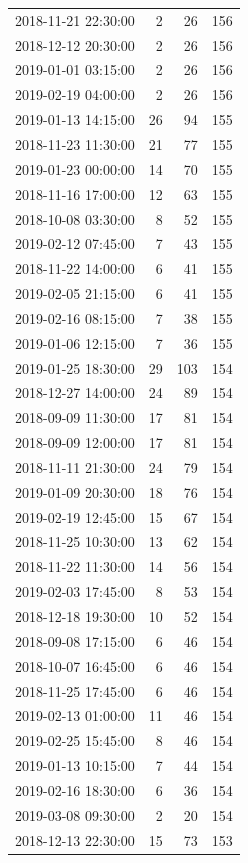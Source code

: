 \begin{tabular}{lrrr}
2018-11-21 22:30:00 & 2 & 26 & 156 \\
2018-12-12 20:30:00 & 2 & 26 & 156 \\
2019-01-01 03:15:00 & 2 & 26 & 156 \\
2019-02-19 04:00:00 & 2 & 26 & 156 \\
2019-01-13 14:15:00 & 26 & 94 & 155 \\
2018-11-23 11:30:00 & 21 & 77 & 155 \\
2019-01-23 00:00:00 & 14 & 70 & 155 \\
2018-11-16 17:00:00 & 12 & 63 & 155 \\
2018-10-08 03:30:00 & 8 & 52 & 155 \\
2019-02-12 07:45:00 & 7 & 43 & 155 \\
2018-11-22 14:00:00 & 6 & 41 & 155 \\
2019-02-05 21:15:00 & 6 & 41 & 155 \\
2019-02-16 08:15:00 & 7 & 38 & 155 \\
2019-01-06 12:15:00 & 7 & 36 & 155 \\
2019-01-25 18:30:00 & 29 & 103 & 154 \\
2018-12-27 14:00:00 & 24 & 89 & 154 \\
2018-09-09 11:30:00 & 17 & 81 & 154 \\
2018-09-09 12:00:00 & 17 & 81 & 154 \\
2018-11-11 21:30:00 & 24 & 79 & 154 \\
2019-01-09 20:30:00 & 18 & 76 & 154 \\
2019-02-19 12:45:00 & 15 & 67 & 154 \\
2018-11-25 10:30:00 & 13 & 62 & 154 \\
2018-11-22 11:30:00 & 14 & 56 & 154 \\
2019-02-03 17:45:00 & 8 & 53 & 154 \\
2018-12-18 19:30:00 & 10 & 52 & 154 \\
2018-09-08 17:15:00 & 6 & 46 & 154 \\
2018-10-07 16:45:00 & 6 & 46 & 154 \\
2018-11-25 17:45:00 & 6 & 46 & 154 \\
2019-02-13 01:00:00 & 11 & 46 & 154 \\
2019-02-25 15:45:00 & 8 & 46 & 154 \\
2019-01-13 10:15:00 & 7 & 44 & 154 \\
2019-02-16 18:30:00 & 6 & 36 & 154 \\
2019-03-08 09:30:00 & 2 & 20 & 154 \\
2018-12-13 22:30:00 & 15 & 73 & 153 \\

\end{tabular}
